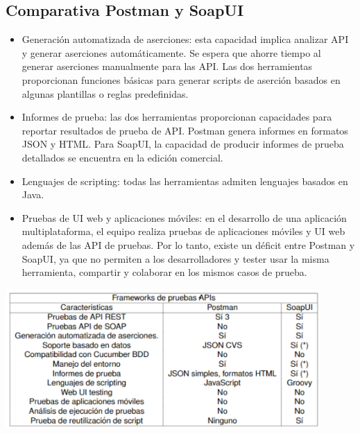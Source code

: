 \documentclass{article}
\begin{document}
\begin{multicols}{2}
\section{Comparativa Postman y SoapUI}

\begin{itemize}
    \item Generación automatizada de aserciones: esta capacidad implica analizar API y generar aserciones automáticamente. Se espera que ahorre tiempo al generar aserciones manualmente para las API. Las dos herramientas proporcionan funciones básicas para generar scripts de aserción basados en algunas plantillas o reglas predefinidas.
    \item Informes de prueba: las dos herramientas proporcionan capacidades para reportar resultados de prueba de API. Postman genera informes en formatos JSON y HTML. Para SoapUI, la capacidad de producir informes de prueba detallados se encuentra en la edición comercial.
    \item Lenguajes de scripting: todas las herramientas admiten lenguajes basados en Java.
    \item Pruebas de UI web y aplicaciones móviles: en el desarrollo de una aplicación multiplataforma, el equipo realiza pruebas de aplicaciones móviles y UI web además de las API de pruebas. Por lo tanto, existe un déficit entre Postman y SoapUI, ya que no permiten a los desarrolladores y tester usar la misma herramienta, compartir y colaborar en los mismos casos de prueba.
\end{itemize}

\end{multicols}

\begin{center}
    \includegraphics[width=12cm]{Imagenes/comparativa.png}
\end{center}
\end{document}
